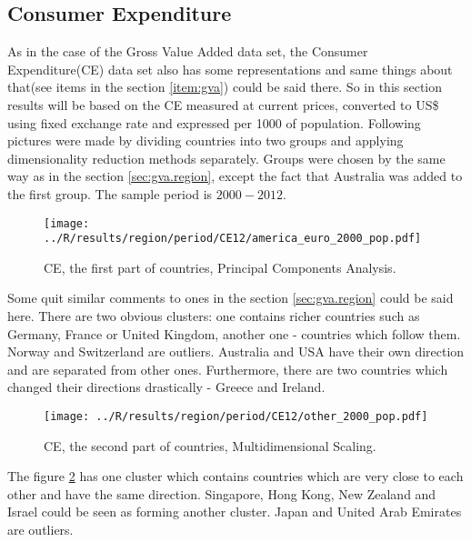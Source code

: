 \documentclass[a4paper]{article}
\begin{document}
\subsection{Consumer Expenditure}
As in the case of the Gross Value Added data set, the Consumer Expenditure(CE) data set also has some representations and same things about that(see items in the section \ref{item:gva}) could be said there. So in this section results will be based on the CE measured at current prices, converted to US\$ using fixed exchange rate and expressed per 1000 of population. Following pictures were made by dividing countries into two groups and applying dimensionality reduction methods separately. Groups were chosen by the same way as in the section \ref{sec:gva.region}, except the fact that Australia was added to the first group. The sample period is $2000-2012$.     

\begin{figure}[!htbp]
\begin{center}
\texttt{[image: ../R/results/region/period/CE12/america\_euro\_2000\_pop.pdf]}
\caption{CE, the first part of countries, Principal Components Analysis.}
\label{fig:ce.region.first.pca}
\end{center}
\end{figure}

Some quit similar comments to ones in the section \ref{sec:gva.region} could be said here. There are two obvious clusters: one contains richer countries such as Germany, France or United Kingdom, another one - countries which follow them. Norway and Switzerland are outliers. Australia and USA have their own direction and are separated from other ones. Furthermore, there are two countries which changed their directions drastically - Greece and Ireland.   

\begin{figure}[!htbp]
\begin{center}
\texttt{[image: ../R/results/region/period/CE12/other\_2000\_pop.pdf]}
\caption{CE, the second part of countries, Multidimensional Scaling.}
\label{fig:ce.region.second.mds}
\end{center}
\end{figure}

The figure \ref{fig:ce.region.second.mds} has one cluster which contains countries which are very close to each other and have the same direction. Singapore, Hong Kong, New Zealand and Israel could be seen as forming another cluster. Japan and United Arab Emirates are outliers.   
\end{document}
